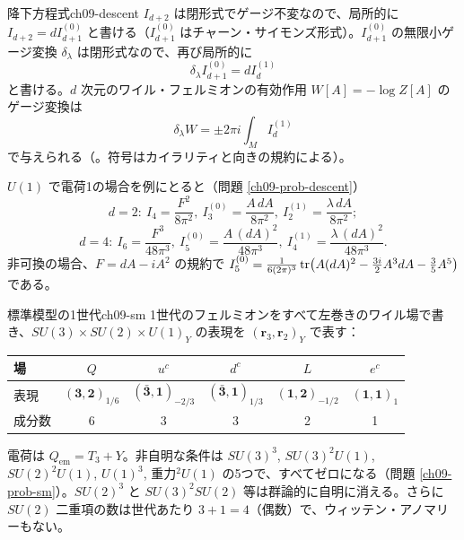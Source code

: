 \begin{mythm}{降下方程式}{ch09-descent}
$I_{d+2}$ は閉形式でゲージ不変なので、局所的に $I_{d+2}=dI^{(0)}_{d+1}$ と書ける（$I^{(0)}_{d+1}$ はチャーン・サイモンズ形式）。$I^{(0)}_{d+1}$ の無限小ゲージ変換 $\delta_\lambda$ は閉形式なので、再び局所的に
\[
\delta_\lambda I^{(0)}_{d+1}=dI^{(1)}_d
\]
と書ける。$d$ 次元のワイル・フェルミオンの有効作用 $W[A]=-\log Z[A]$ のゲージ変換は
\[
\delta_\lambda W=\pm2\pi i\int_MI^{(1)}_d
\]
で与えられる（。符号はカイラリティと向きの規約による）。
\end{mythm}
\begin{center}
\end{center}
$U(1)$ で電荷1の場合を例にとると（問題 \ref{ch09-prob-descent}）
\[
d=2:\ I_4=\frac{F^2}{8\pi^2},\ I_3^{(0)}=\frac{A\,dA}{8\pi^2},\ I_2^{(1)}=\frac{\lambda\,dA}{8\pi^2};
\]
\[
d=4:\ I_6=\frac{F^3}{48\pi^3},\ I_5^{(0)}=\frac{A\,(dA)^2}{48\pi^3},\ I_4^{(1)}=\frac{\lambda\,(dA)^2}{48\pi^3}.
\]
非可換の場合、$F=dA-iA^2$ の規約で $I_5^{(0)}=\frac{1}{6(2\pi)^3}\tr\bigl(A(dA)^2-\frac{3i}{2}A^3dA-\frac35A^5\bigr)$ である。

\begin{myex}{標準模型の1世代}{ch09-sm}
1世代のフェルミオンをすべて左巻きのワイル場で書き、$SU(3)\times SU(2)\times U(1)_Y$ の表現を $(\mathbf r_3,\mathbf r_2)_Y$ で表す：
\begin{center}
\renewcommand{\arraystretch}{1.2}\small
\begin{tabular}{lccccc}
場 & $Q$ & $u^c$ & $d^c$ & $L$ & $e^c$\\ \hline
表現 & $(\mathbf 3,\mathbf 2)_{1/6}$ & $(\bar{\mathbf 3},\mathbf 1)_{-2/3}$ & $(\bar{\mathbf 3},\mathbf 1)_{1/3}$ & $(\mathbf 1,\mathbf 2)_{-1/2}$ & $(\mathbf 1,\mathbf 1)_{1}$\\
成分数 & 6 & 3 & 3 & 2 & 1
\end{tabular}
\end{center}
電荷は $Q_{\mathrm{em}}=T_3+Y$。非自明な条件は $SU(3)^3$, $SU(3)^2U(1)$, $SU(2)^2U(1)$, $U(1)^3$, 重力$^2U(1)$ の5つで、すべてゼロになる（問題 \ref{ch09-prob-sm}）。$SU(2)^3$ と $SU(3)^2SU(2)$ 等は群論的に自明に消える。さらに $SU(2)$ 二重項の数は世代あたり $3+1=4$（偶数）で、ウィッテン・アノマリーもない。
\end{myex}

